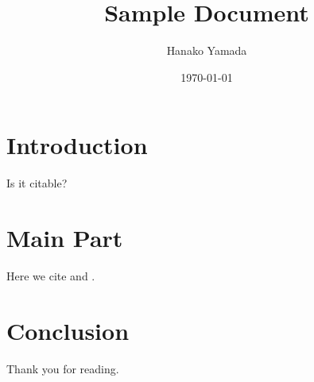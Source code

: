 \documentclass[a4paper]{article}
\begin{document}
\title{\huge Sample Document}
\author{Hanako Yamada}
\date{\today}
\maketitle

\section{Introduction}
Is it citable? \autocite{Haxby2425}

\section{Main Part}
Here we cite \textcite{Mitchell1191} and \textcite{Haxby2425}.

\section{Conclusion}
Thank you for reading.

\newpage
\printbibliography

\newpage
\appendix

\end{document}
